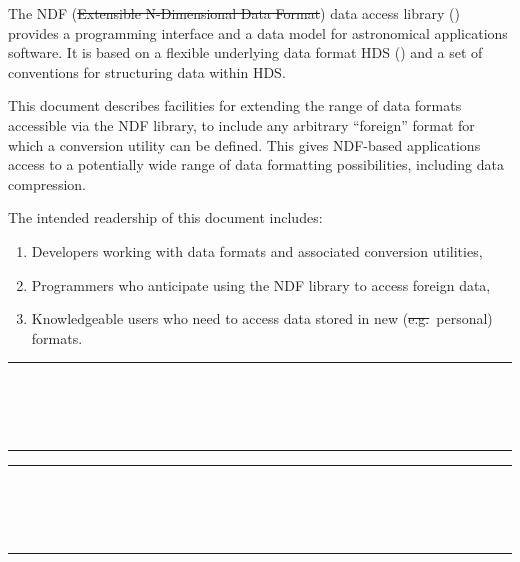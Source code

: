 The NDF (\st{Extensible N-Dimensional Data Format\/}) data access
library () provides a programming interface and
a data model for astronomical applications software. It is based on a
flexible underlying data format HDS () and a set
of conventions for structuring data within HDS.

This document describes facilities for extending the range of data
formats accessible via the NDF library, to include any arbitrary
``foreign'' format for which a conversion utility can be defined.
This gives NDF-based applications access to a potentially wide range
of data formatting possibilities, including data compression.

The intended readership of this document includes:
\begin{enumerate}
\item Developers working with data formats and associated conversion
utilities,
\item Programmers who anticipate using the NDF library to access foreign data,
\item Knowledgeable users who need to access data stored in new
(\st{e.g.}\ personal) formats.
\end{enumerate}
 \newpage
 \begin{latexonly}
   \null\vspace {5mm}
   \begin {center}
   \rule{80mm}{0.5mm} \\ [1ex]
   {\Large\bf \stardoctitle \\ [2.5ex]
              \stardocversion} \\ [2ex]
   \rule{80mm}{0.5mm}
   \end{center}
   \setlength{\parskip}{0mm}
   \tableofcontents
   \setlength{\parskip}{\medskipamount}
   \markright{\stardocname}
 \end{latexonly}

\newpage
\renewcommand{\thepage}{\arabic{page}}
\setcounter{page}{1}
\begin{latexonly}
   \null\vspace {5mm}
   \begin {center}
   \rule{80mm}{0.5mm} \\ [1ex]
   {\Large\bf \stardoctitle \\ [2.5ex]
              \stardocversion} \\ [2ex]
   \rule{80mm}{0.5mm}
   \end{center}
   \vspace{30mm}
\end{latexonly}

